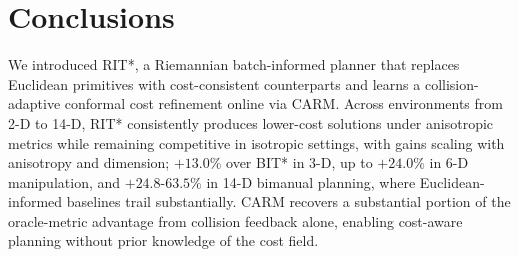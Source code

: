 \documentclass[journal]{IEEEtran}
\begin{document}
\section{Conclusions}
We introduced RIT*, a Riemannian batch-informed planner that replaces Euclidean primitives with cost-consistent counterparts and learns a collision-adaptive conformal cost refinement online via CARM. Across environments from 2-D to 14-D, RIT* consistently produces lower-cost solutions under anisotropic metrics while remaining competitive in isotropic settings, with gains scaling with anisotropy and dimension; $+13.0\%$ over BIT* in 3-D, up to $+24.0\%$ in 6-D manipulation, and $+24.8$-$63.5\%$ in 14-D bimanual planning, where Euclidean-informed baselines trail substantially. CARM recovers a substantial portion of the oracle-metric advantage from collision feedback alone, enabling cost-aware planning without prior knowledge of the cost field.




\balance
\end{document}
